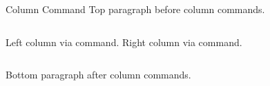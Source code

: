 \documentclass[14pt,t]{beamer}
\begin{document}
\begin{frame}{Column Command}
Top paragraph before column commands.

\begin{columns}[T]
Left column via command.
Right column via command.
\end{columns}

Bottom paragraph after column commands.
\end{frame}
\end{document}
